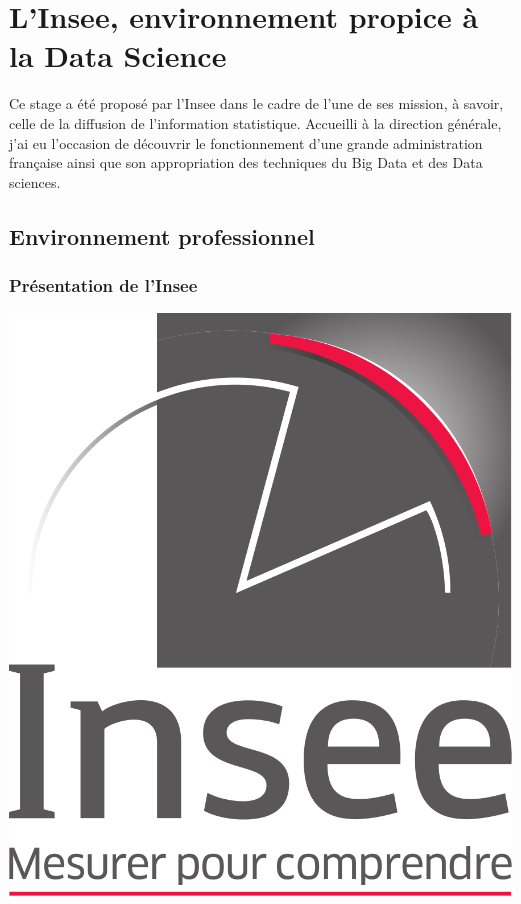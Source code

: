 \section{L'Insee, environnement propice à la Data Science}
Ce stage a été proposé par l'Insee dans le cadre de l'une de ses mission, à savoir, celle de la diffusion de l'information statistique. Accueilli à la direction générale, j'ai eu l'occasion de découvrir le fonctionnement d'une grande administration française ainsi que son appropriation des techniques du Big Data et des Data sciences.

\subsection{Environnement professionnel}

\subsubsection{Présentation de l'Insee}
\vspace{10pt}
\begin{center}
\includegraphics[scale=0.12]{images/Logo_Insee.png} 
\end{center}

